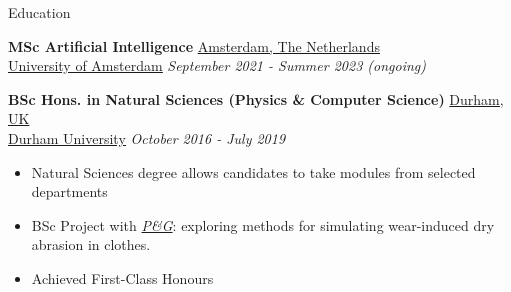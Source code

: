\documentclass{resume} %
\begin{document}
\begin{rSection}{Education}

	{\bf MSc Artificial Intelligence} \hfill \underline{Amsterdam, The Netherlands}
	\\\href{https://www.dur.ac.uk/}{\underline{University of Amsterdam}} \hfill {\em September 2021
	- Summer 2023 (ongoing)}

	{\bf BSc Hons. in Natural Sciences (Physics \& Computer Science)} \hfill \underline{Durham, UK}
	\\\href{https://www.dur.ac.uk/}{\underline{Durham University}} \hfill {\em October 2016 - July 2019}
	\begin{itemize}\vspace{-0.5em}
		\item Natural Sciences degree allows candidates to take modules from selected departments
		\item BSc Project with \href{https://us.pg.com/}{\textit{P\&G}}: exploring methods for simulating wear-induced dry abrasion in clothes.
		\item Achieved First-Class Honours
	\end{itemize}
\end{rSection}
\end{document}
